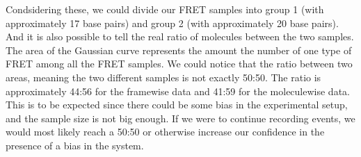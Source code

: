 \documentclass[a4paper,english,12pt,bibliography=totoc]{scrreprt}
\begin{document}

Condsidering these, we could divide our FRET samples into group 1 (with approximately 17 base pairs) and group 2 (with approximately 20 base pairs). And it is also possible to tell the real ratio of  molecules between the two samples. The area of the Gaussian curve represents the amount the number of one type of FRET among all the FRET samples. We could notice that the ratio between two areas, meaning the two different samples is not exactly 50:50. The ratio is approximately 44:56 for the framewise data and 41:59 for the moleculewise data.
This is to be expected since there could be some bias in the experimental setup, and the sample size is not big enough. If we were to continue recording events, we would most likely reach a 50:50 or otherwise increase our confidence in the presence of a bias in the system. 
\end{document}
